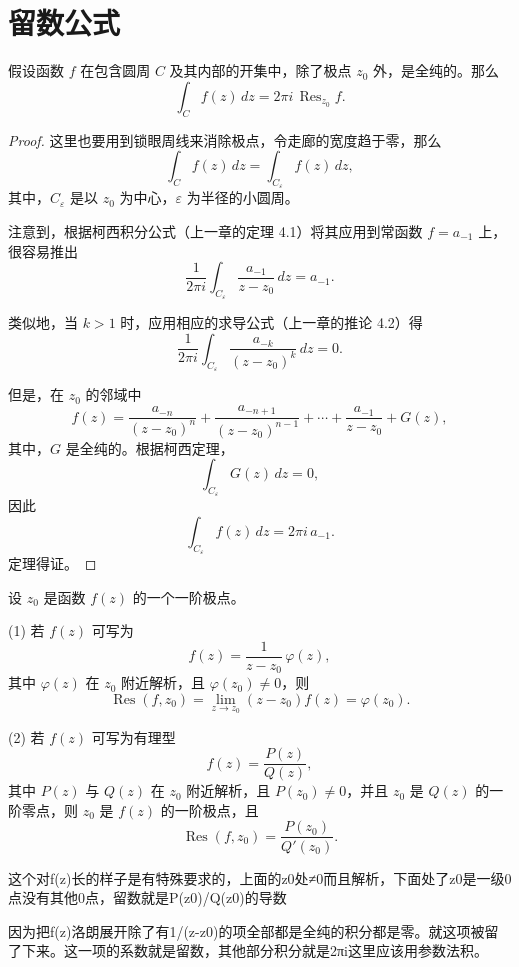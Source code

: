 \documentclass[lang=cn,10pt]{elegantbook}
\begin{document}
\section{留数公式}
\begin{theorem}[2.1]
假设函数 $f$ 在包含圆周 $C$ 及其内部的开集中，除了极点 $z_0$ 外，是全纯的。那么
\[
\int_{C} f(z)\,dz = 2\pi i \,\operatorname{Res}_{z_0} f.
\]
\end{theorem}
\begin{proof}
这里也要用到锁眼周线来消除极点，令走廊的宽度趋于零，那么
\[
\int_{C} f(z)\,dz = \int_{C_\varepsilon} f(z)\,dz,
\]
其中，$C_\varepsilon$ 是以 $z_0$ 为中心，$\varepsilon$ 为半径的小圆周。

注意到，根据柯西积分公式（上一章的定理 4.1）将其应用到常函数 $f = a_{-1}$ 上，很容易推出
\[
\frac{1}{2\pi i} \int_{C_\varepsilon} \frac{a_{-1}}{z-z_0}\,dz = a_{-1}.
\]

类似地，当 $k > 1$ 时，应用相应的求导公式（上一章的推论 4.2）得
\[
\frac{1}{2\pi i} \int_{C_\varepsilon} \frac{a_{-k}}{(z-z_0)^k}\,dz = 0.
\]

但是，在 $z_0$ 的邻域中
\[
f(z) = \frac{a_{-n}}{(z-z_0)^n}
     + \frac{a_{-n+1}}{(z-z_0)^{n-1}}
     + \cdots
     + \frac{a_{-1}}{z-z_0}
     + G(z),
\]
其中，$G$ 是全纯的。根据柯西定理，
\[
\int_{C_\varepsilon} G(z)\,dz = 0,
\]
因此
\[
\int_{C_\varepsilon} f(z)\,dz = 2\pi i\, a_{-1}.
\]
定理得证。
\end{proof}
\begin{proposition}[一阶极点的留数公式]
设 $z_0$ 是函数 $f(z)$ 的一个一阶极点。

(1) 若 $f(z)$ 可写为
\[
f(z) = \frac{1}{z-z_0}\,\varphi(z),
\]
其中 $\varphi(z)$ 在 $z_0$ 附近解析，且 $\varphi(z_0) \neq 0$，则
\[
\operatorname{Res}(f,z_0) = \lim_{z \to z_0} (z-z_0)f(z) = \varphi(z_0).
\]

(2) 若 $f(z)$ 可写为有理型
\[
f(z) = \frac{P(z)}{Q(z)},
\]
其中 $P(z)$ 与 $Q(z)$ 在 $z_0$ 附近解析，且 $P(z_0) \neq 0$，并且 $z_0$ 是 $Q(z)$ 的一阶零点，则 $z_0$ 是 $f(z)$ 的一阶极点，且
\[
\operatorname{Res}(f,z_0) = \frac{P(z_0)}{Q'(z_0)}.
\]
\end{proposition}
这个对f(z)长的样子是有特殊要求的，上面的z0处≠0而且解析，下面处了z0是一级0点没有其他0点，留数就是P(z0)/Q(z0)的导数
\begin{dxtips}
  因为把f(z)洛朗展开除了有1/(z-z0)的项全部都是全纯的积分都是零。就这项被留了下来。这一项的系数就是留数，其他部分积分就是2πi这里应该用参数法积。  
\end{dxtips}
\end{document}
